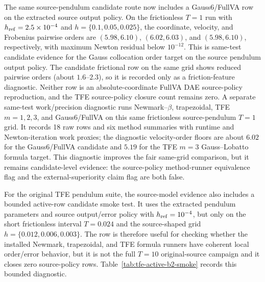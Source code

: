 \documentclass[preprint,12pt]{elsarticle}
\newcommand{\method}{Gauss6\slash FullVA}
\newcommand{\tfe}{TFE}
\begin{document}
The same source-pendulum candidate route now includes a \method{} row on
the extracted source output policy.  On the frictionless $T=1$ run with
$h_{\rm ref}=2.5\times 10^{-4}$ and $h=\{0.1,0.05,0.025\}$, the coordinate,
velocity, and Frobenius pairwise orders are
$(5.98,6.10)$, $(6.02,6.03)$, and $(5.98,6.10)$, respectively, with maximum
Newton residual below $10^{-12}$.  This is same-test candidate evidence for
the Gauss collocation order target on the source pendulum output policy.  The
candidate frictional row on the same grid shows reduced pairwise orders
(about $1.6$--$2.3$), so it is recorded only as a friction-feature diagnostic.
Neither row is an absolute-coordinate FullVA DAE source-policy reproduction,
and the \tfe{} source-policy closure count remains zero.
A separate same-test work/precision diagnostic runs Newmark--$\beta$,
trapezoidal, \tfe{} $m=1,2,3$, and \method{} on this same frictionless
source-pendulum $T=1$ grid.  It records 18 raw rows and six method summaries
with runtime and Newton-iteration work proxies; the diagnostic velocity-order
floors are about $6.02$ for the \method{} candidate and $5.19$ for the
\tfe{} $m=3$ Gauss--Lobatto formula target.  This diagnostic improves the
fair same-grid comparison, but it remains candidate-level evidence: the
source-policy method-runner equivalence flag and the external-superiority
claim flag are both false.

For the original \tfe{} pendulum suite, the source-model evidence also
includes a bounded active-row candidate smoke test. It uses the extracted
pendulum parameters and source output/error policy with
$h_{\rm ref}=10^{-4}$, but only on the short frictionless interval
$T=0.024$ and the source-shaped grid
$h=\{0.012,0.006,0.003\}$. The row is therefore useful for checking whether
the installed Newmark, trapezoidal, and \tfe{} formula runners have coherent
local order/error behavior, but it is not the full $T=10$ original-source
campaign and it closes zero source-policy rows. Table~\ref{tab:tfe-active-b2-smoke}
records this bounded diagnostic.
\end{document}
